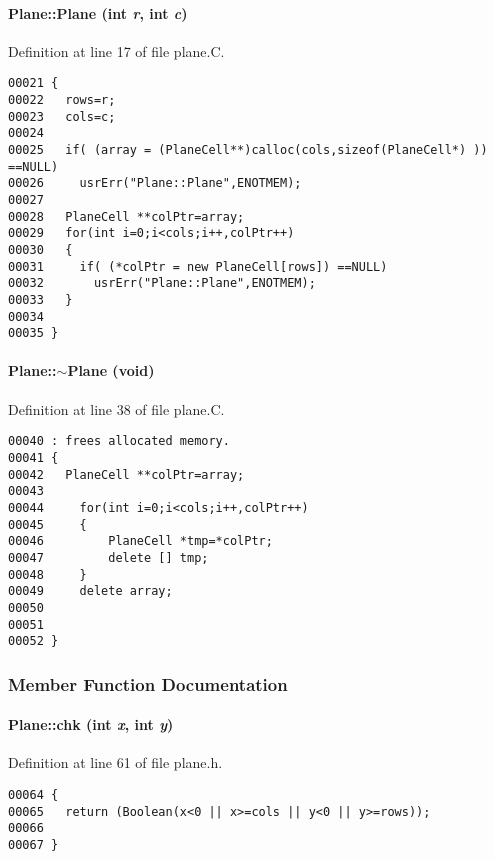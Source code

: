 \paragraph{\setlength{\rightskip}{0pt plus 5cm}Plane::Plane (int {\em r}, int {\em c})}\hfill



Definition at line 17 of file plane.C.\small\begin{verbatim}00021 {
00022   rows=r;
00023   cols=c;
00024 
00025   if( (array = (PlaneCell**)calloc(cols,sizeof(PlaneCell*) )) ==NULL)
00026     usrErr("Plane::Plane",ENOTMEM);
00027   
00028   PlaneCell **colPtr=array;
00029   for(int i=0;i<cols;i++,colPtr++)
00030   {
00031     if( (*colPtr = new PlaneCell[rows]) ==NULL)
00032       usrErr("Plane::Plane",ENOTMEM);
00033   }
00034 
00035 }
\end{verbatim}\normalsize 
\label{Plane_a1}
\paragraph{\setlength{\rightskip}{0pt plus 5cm}Plane::$\sim$Plane (void)}\hfill



Definition at line 38 of file plane.C.\small\begin{verbatim}00040 : frees allocated memory.
00041 {
00042   PlaneCell **colPtr=array;
00043 
00044     for(int i=0;i<cols;i++,colPtr++)
00045     {
00046         PlaneCell *tmp=*colPtr;
00047         delete [] tmp;
00048     }
00049     delete array;
00050 
00051 
00052 }
\end{verbatim}\normalsize 


\subsubsection{Member Function Documentation}
\label{Plane_c0}
\paragraph{ Plane::chk (int {\em x}, int {\em y})\hspace{0.3cm}{\tt  [inline, private]}}\hfill



Definition at line 61 of file plane.h.\small\begin{verbatim}00064 {
00065   return (Boolean(x<0 || x>=cols || y<0 || y>=rows));
00066 
00067 }
\end{verbatim}\normalsize 
\label{Plane_a3}
